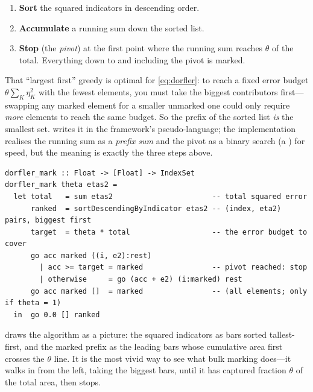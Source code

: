 \begin{enumerate}[nosep]
\item \textbf{Sort} the squared indicators in descending order.
\item \textbf{Accumulate} a running sum down the sorted list.
\item \textbf{Stop} (the \emph{pivot}) at the first point where the running sum
reaches $\theta$ of the total. Everything down to and including the pivot is marked.
\end{enumerate}

That ``largest first'' greedy is optimal for \cref{eq:dorfler}: to reach a fixed
error budget $\theta\sum_K\eta_K^2$ with the fewest elements, you must take the
biggest contributors first---swapping any marked element for a smaller unmarked one
could only require \emph{more} elements to reach the same budget. So the prefix of the
sorted list \emph{is} the smallest set.  writes it in the
framework's pseudo-language; the implementation realises the running sum as a
\emph{prefix sum} and the pivot as a binary search (a ) for speed,
but the meaning is exactly the three steps above.

\begin{lstlisting}[style=l4style,caption={D\"orfler bulk marking: the smallest set covering fraction $\theta$ of the squared error.},label={alg:dorfler}]
dorfler_mark :: Float -> [Float] -> IndexSet
dorfler_mark theta etas2 =
  let total   = sum etas2                       -- total squared error
      ranked  = sortDescendingByIndicator etas2 -- (index, eta2) pairs, biggest first
      target  = theta * total                   -- the error budget to cover
      go acc marked ((i, e2):rest)
        | acc >= target = marked                -- pivot reached: stop
        | otherwise     = go (acc + e2) (i:marked) rest
      go acc marked []  = marked                -- (all elements; only if theta = 1)
  in  go 0.0 [] ranked
\end{lstlisting}

 draws the algorithm as a picture: the squared indicators as
bars sorted tallest-first, and the marked prefix as the leading bars whose cumulative
area first crosses the $\theta$ line. It is the most vivid way to see what bulk
marking does---it walks in from the left, taking the biggest bars, until it has
captured fraction $\theta$ of the total area, then stops.

